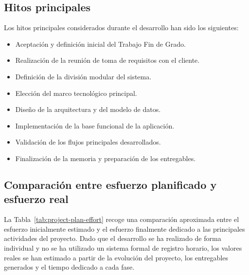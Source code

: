\subsection{Hitos principales}

Los hitos principales considerados durante el desarrollo han sido los siguientes:

\begin{itemize}
    \item Aceptación y definición inicial del Trabajo Fin de Grado.
    \item Realización de la reunión de toma de requisitos con el cliente.
    \item Definición de la división modular del sistema.
    \item Elección del marco tecnológico principal.
    \item Diseño de la arquitectura y del modelo de datos.
    \item Implementación de la base funcional de la aplicación.
    \item Validación de los flujos principales desarrollados.
    \item Finalización de la memoria y preparación de los entregables.
\end{itemize}

\subsection{Comparación entre esfuerzo planificado y esfuerzo real}

La Tabla~\ref{tab:project-plan-effort} recoge una comparación aproximada entre el esfuerzo inicialmente estimado y el esfuerzo finalmente dedicado a las principales actividades del proyecto. Dado que el desarrollo se ha realizado de forma individual y no se ha utilizado un sistema formal de registro horario, los valores reales se han estimado a partir de la evolución del proyecto, los entregables generados y el tiempo dedicado a cada fase.

